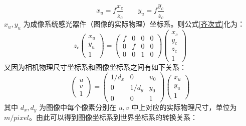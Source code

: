\begin{equation}
x_u=f\frac{x_c}{z_c} \qquad y_u=f\frac{y_c}{z_c}
\end{equation}
$x_u,y_u$ 为成像系统感光器件（图像的实际物理）坐标系。则公式\ref{齐次式}化为：
\begin{equation}
z_c\begin{pmatrix}
x_u \\
y_u \\
1    \end{pmatrix} = \begin{pmatrix}
f & 0 & 0 & 0\\
0 & f & 0 & 0\\
0 & 0 & 1 & 0\end{pmatrix}
\begin{pmatrix}
x_c \\
y_c \\
z_c \\
1    \end{pmatrix}
\end{equation}
又因为相机物理尺寸坐标系和图像坐标系之间有如下关系：
\begin{equation}
\begin{pmatrix}
u \\
v \\
1    \end{pmatrix} = \begin{pmatrix}
1/d_x & 0 & u_0\\
0 & 1/d_y & y_0\\
0 & 0 & 1\end{pmatrix}
\begin{pmatrix}
x_u \\
y_u \\
1 \end{pmatrix}
\end{equation}
其中 $d_x,d_y$ 为图像中每个像素分别在 $u,v$ 中上对应的实际物理尺寸，单位为$m/pixel$。由此可以得到图像坐标系到世界坐标系的转换关系：
